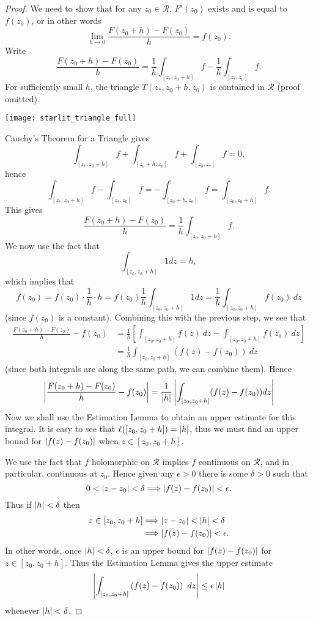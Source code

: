 \begin{proof}
We need to show that for any $z_0 \in \mathcal{R}$, $F'(z_0)$ exists and is equal to $f(z_0)$, or in other words
\[
\lim_{h \to 0} \frac{F(z_0+h)-F(z_0)}{h} = f(z_0).
\]
  Write
\[
\frac{F(z_0+h)-F(z_0)}{h} = \frac{1}{h} \int_{[z_{\ast},z_0+h]} f - \frac{1}{h} \int_{[z_{\ast},z_0]} f.
\]
For sufficiently small $h$, the triangle $T(z_{\ast},z_0+h,z_0)$ is contained in $\mathcal{R}$ (proof omitted).
\begin{center}
\texttt{[image: starlit\_triangle\_full]}
\end{center}

  Cauchy's Theorem for a Triangle gives
\[
\int_{[z_*,z_0+h]} f + \int_{[z_0+h,z_0]} f + \int_{[z_0,z_*]} f = 0,
\]
hence
\[
\int_{[z_*,z_0+h]}f - \int_{[z_*,z_0]}f = - \int_{[z_0+h,z_0]} f = \int_{[z_0,z_0+h]} f.
\]
This gives
\[
\frac{F(z_0+h)-F(z_0)}{h} = \frac{1}{h} \int_{[z_0,z_0+h]} f.
\]
We now use the fact that
\[
\int_{[z_0,z_0+h]} 1 dz = h,
\]
which implies that
\[
f(z_0) = f(z_0) \cdot \frac{1}{h} \cdot h = f(z_0) \frac{1}{h} \int_{[z_0,z_0+h]} 1 dz = \frac{1}{h} \int_{[z_0,z_0+h]} f(z_0)\ dz
\]
(since $f(z_0)$ is a constant).  Combining this with the previous step, we see that 
\begin{align*}
 \frac{F(z_0+h)-F(z_0)}{h}-f(z_0)  &= \frac{1}{h} \left[ \int_{[z_0,z_0+h]} f(z)\ dz - \int_{[z_0,z_0+h]} f(z_0)\ dz \right] \\
& = \frac{1}{h} \int_{[z_0,z_0+h]} (f(z)-f(z_0))\ dz 
\end{align*}
(since both integrals are along the same path, we can combine them).
Hence
\[
\left|  \frac{F(z_0+h)-F(z_0)}{h}-f(z_0)  \right| = \frac{1}{\left| h \right|} \left|  \int_{[z_0,z_0+h]} (f(z)-f(z_0)) dz  \right|
\]
Now we shall use the Estimation Lemma to obtain an upper estimate for this integral.  It is easy to see that $\ell([z_0,z_0+h]) = \left| h \right|$, thus we must find an upper bound for $\left| f(z)-f(z_0) \right|$ when $z \in [z_0,z_0+h]$.


We use the fact that $f$ holomorphic on $\mathcal{R}$ implies $f$ continuous on $\mathcal{R}$, and in particular, continuous at $z_0$.  Hence given any $\epsilon >0$ there is some $\delta >0$ such that
\[
0< \left| z-z_0 \right| < \delta \Longrightarrow \left| f(z)-f(z_0) \right| < \epsilon.
\]
Thus if $\left| h \right| < \delta$ then
\begin{align*}
z \in [z_0,z_0+h] & \Longrightarrow \left| z-z_0 \right| < \left| h \right| < \delta \\
& \Longrightarrow \left| f(z)-f(z_0) \right| < \epsilon.
\end{align*}
In other words, once $\left| h \right|<\delta$, $\epsilon$ is an upper bound for $\left| f(z)-f(z_0) \right|$ for $z \in [z_0,z_0+h]$.  Thus the Estimation Lemma gives the upper estimate
\[
\left|  \int_{[z_0,z_0+h]} \left( f(z)-f(z_0) \right)\ dz  \right| \leq \epsilon \left| h \right|
\]
whenever $\left| h \right| < \delta$.


\end{proof}
